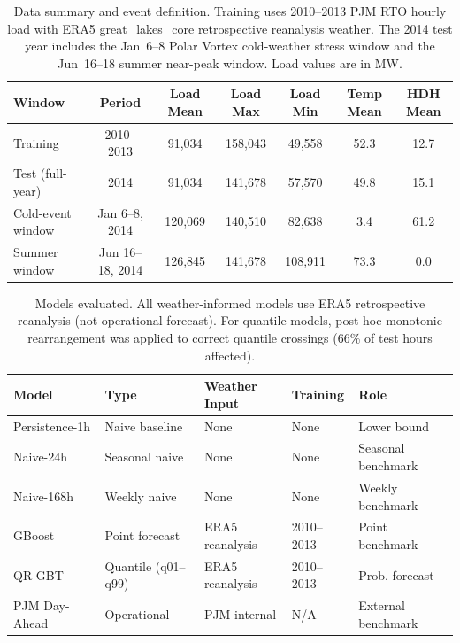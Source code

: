 
\begin{table}[htbp]
\centering
\caption{Data summary and event definition. Training uses 2010--2013 PJM RTO hourly load with ERA5 great\_lakes\_core retrospective reanalysis weather. The 2014 test year includes the Jan~6--8 Polar Vortex cold-weather stress window and the Jun~16--18 summer near-peak window. Load values are in MW.}
\label{tab:data_summary}
\begin{tabular}{lcccccc}
\toprule
Window & Period & Load Mean & Load Max & Load Min & Temp Mean & HDH Mean \\
\midrule
Training & 2010--2013 & 91,034 & 158,043 & 49,558 & 52.3 & 12.7 \\
Test (full-year) & 2014 & 91,034 & 141,678 & 57,570 & 49.8 & 15.1 \\
Cold-event window & Jan 6--8, 2014 & 120,069 & 140,510 & 82,638 & 3.4 & 61.2 \\
Summer window & Jun 16--18, 2014 & 126,845 & 141,678 & 108,911 & 73.3 & 0.0 \\
\bottomrule
\end{tabular}
\end{table}


\begin{table}[htbp]
\centering
\caption{Models evaluated. All weather-informed models use ERA5 retrospective reanalysis (not operational forecast). For quantile models, post-hoc monotonic rearrangement was applied to correct quantile crossings (66\% of test hours affected).}
\label{tab:model_summary}
\begin{tabular}{lllll}
\toprule
Model & Type & Weather Input & Training & Role \\
\midrule
Persistence-1h & Naive baseline & None & None & Lower bound \\
Naive-24h & Seasonal naive & None & None & Seasonal benchmark \\
Naive-168h & Weekly naive & None & None & Weekly benchmark \\
GBoost & Point forecast & ERA5 reanalysis & 2010--2013 & Point benchmark \\
QR-GBT & Quantile (q01--q99) & ERA5 reanalysis & 2010--2013 & Prob. forecast \\
PJM Day-Ahead & Operational & PJM internal & N/A & External benchmark \\
\bottomrule
\end{tabular}
\end{table}

